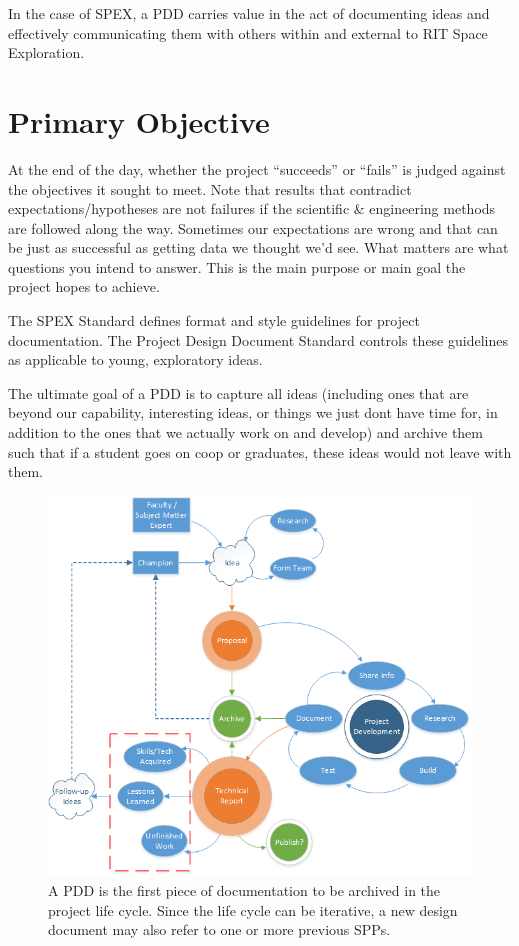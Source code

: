 \documentclass[journal]{SPEXformat}
\newenvironment{help}{
  \ttfamily\footnotesize\sloppy
  \begin{lrbox}{\helpbox}\begin{minipage}{\linewidth}
  }{
  \end{minipage}\end{lrbox}
  \ifbool{showhelp}{
    \fbox{\usebox{\helpbox}}
  }{}
}
\begin{document}
In the case of SPEX, a PDD carries value in the act of documenting ideas and effectively communicating them with others within and external to RIT Space Exploration.

\section{Primary Objective}
\label{sec:primary-obj}
\begin{help}
  At the end of the day, whether the project ``succeeds'' or ``fails'' is judged against the objectives it sought to meet.
  Note that results that contradict expectations/hypotheses are not failures if the scientific \& engineering methods are followed along the way.
  Sometimes our expectations are wrong and that can be just as successful as getting data we thought we'd see.
  What matters are what questions you intend to answer.
  This is the main purpose or main goal the project hopes to achieve.
\end{help}

The SPEX Standard defines format and style guidelines for project documentation. The Project Design Document Standard controls these guidelines as applicable to young, exploratory ideas.

The ultimate goal of a PDD is to capture all ideas (including ones that are beyond our capability, interesting ideas, or things we just dont have time for, in addition to the ones that we actually work on and develop) and archive them such that if a student goes on coop or graduates, these ideas would not leave with them.

\begin{figure}
  \includegraphics[width=\linewidth]{figs/project-life-cycle.png}
  \caption{A PDD is the first piece of documentation to be archived in the project life cycle. Since the life cycle can be iterative, a new design document may also refer to one or more previous SPPs.}
\label{fig:lifecycle}
\end{figure}
\end{document}
